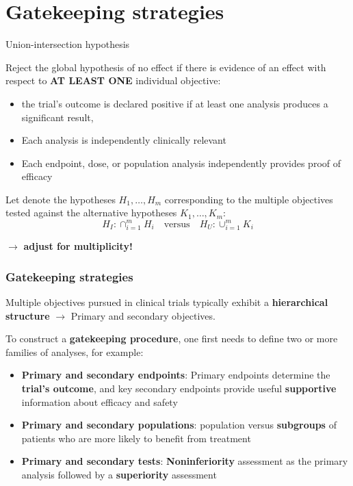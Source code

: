 \documentclass[xcolor={dvipsnames}]{beamer}
\newcommand{\rbf}[1]{\textcolor{redUnipd}{ #1}}
\begin{document}
\section{Gatekeeping strategies}
\begin{frame}{Union-intersection hypothesis}

Reject the global hypothesis of no effect if there is evidence of an effect with respect to \textbf{\rbf{AT LEAST ONE}} individual objective:

\begin{itemize}
    \item the trial's outcome is declared positive if at least one analysis produces a significant result,
    \item Each analysis is independently clinically relevant
    \item Each endpoint, dose, or population analysis independently provides proof of efficacy
\end{itemize}
\vspace{.5cm}

Let denote the hypotheses $H_1, \dots, H_m$ corresponding to the multiple objectives tested against the alternative hypotheses $K_1, \dots, K_m$:
\begin{equation*}
    \boxed{H_I: \cap_{i = 1}^m H_i \quad \text{versus} \quad H_U: \cup_{i=1}^m K_i}
\end{equation*}

\vspace{.5cm}

$\rightarrow$ \textbf{\rbf{adjust for multiplicity!}}

\end{frame}



\begin{frame}
\frametitle{Gatekeeping strategies}
Multiple objectives pursued in clinical trials typically exhibit a \textbf{hierarchical structure} $\rightarrow$ Primary and secondary objectives.

\bigskip

To construct a \textbf{gatekeeping procedure}, one first needs to define two or
more families of analyses, for example:
\begin{itemize}
    \item \rbf{\textbf{Primary and secondary endpoints}}: Primary endpoints determine the \textbf{trial's outcome}, and key secondary endpoints provide useful \textbf{supportive} information about efficacy and safety
    \item \rbf{\textbf{Primary and secondary populations}}:  population versus \textbf{subgroups} of patients who are more likely to benefit from treatment
    \item \rbf{\textbf{Primary and secondary tests}}: \textbf{Noninferiority} assessment as the primary analysis followed by a  \textbf{superiority} assessment
\end{itemize}


\end{frame}
\end{document}
